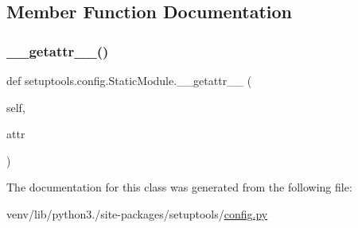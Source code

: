 \subsection{Member Function Documentation}
\mbox{\label{classsetuptools_1_1config_1_1StaticModule_ae4aae1f558bb41fd8adeaeb7b85654f2}} 
\subsubsection{\texorpdfstring{\+\_\+\+\_\+getattr\+\_\+\+\_\+()}{\_\_getattr\_\_()}}
{\footnotesize\ttfamily def setuptools.\+config.\+Static\+Module.\+\_\+\+\_\+getattr\+\_\+\+\_\+ (\begin{DoxyParamCaption}\item[{}]{self,  }\item[{}]{attr }\end{DoxyParamCaption})}



The documentation for this class was generated from the following file\+:\begin{DoxyCompactItemize}
\item 
venv/lib/python3./site-\/packages/setuptools/\hyperlink{setuptools_2config_8py}{config.\+py}\end{DoxyCompactItemize}
